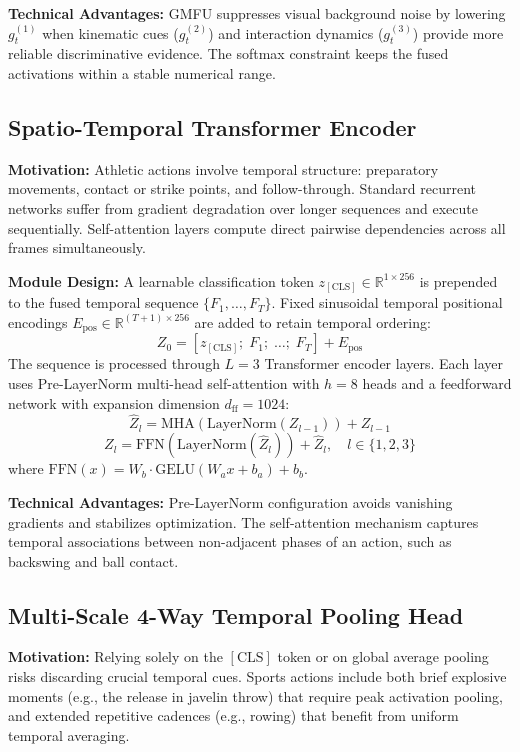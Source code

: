 \documentclass[conference]{IEEEtran}
\begin{document}
\textbf{Technical Advantages:} GMFU suppresses visual background noise by lowering $g_t^{(1)}$ when kinematic cues ($g_t^{(2)}$) and interaction dynamics ($g_t^{(3)}$) provide more reliable discriminative evidence. The softmax constraint keeps the fused activations within a stable numerical range.

\subsection{Spatio-Temporal Transformer Encoder}
\textbf{Motivation:} Athletic actions involve temporal structure: preparatory movements, contact or strike points, and follow-through. Standard recurrent networks suffer from gradient degradation over longer sequences and execute sequentially. Self-attention layers compute direct pairwise dependencies across all frames simultaneously.

\textbf{Module Design:} A learnable classification token $z_{[\text{CLS}]} \in \mathbb{R}^{1 \times 256}$ is prepended to the fused temporal sequence $\{F_1, \dots, F_T\}$. Fixed sinusoidal temporal positional encodings $E_{\text{pos}} \in \mathbb{R}^{(T+1) \times 256}$ are added to retain temporal ordering:
\begin{equation}
Z_0 = [z_{[\text{CLS}]}; \; F_1; \; \dots; \; F_T] + E_{\text{pos}}
\end{equation}
The sequence is processed through $L = 3$ Transformer encoder layers. Each layer uses Pre-LayerNorm multi-head self-attention with $h = 8$ heads and a feedforward network with expansion dimension $d_{\text{ff}} = 1024$:
\begin{equation}
\hat{Z}_l = \text{MHA}(\text{LayerNorm}(Z_{l-1})) + Z_{l-1}
\end{equation}
\begin{equation}
Z_l = \text{FFN}(\text{LayerNorm}(\hat{Z}_l)) + \hat{Z}_l, \quad l \in \{1, 2, 3\}
\end{equation}
where $\text{FFN}(x) = W_b \cdot \text{GELU}(W_a x + b_a) + b_b$.

\textbf{Technical Advantages:} Pre-LayerNorm configuration avoids vanishing gradients and stabilizes optimization. The self-attention mechanism captures temporal associations between non-adjacent phases of an action, such as backswing and ball contact.

\subsection{Multi-Scale 4-Way Temporal Pooling Head}
\textbf{Motivation:} Relying solely on the $[\text{CLS}]$ token or on global average pooling risks discarding crucial temporal cues. Sports actions include both brief explosive moments (e.g., the release in javelin throw) that require peak activation pooling, and extended repetitive cadences (e.g., rowing) that benefit from uniform temporal averaging.
\end{document}
